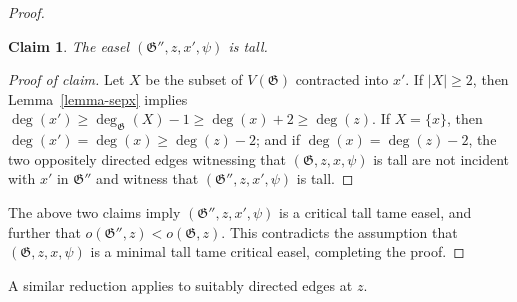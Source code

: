 \documentclass{article}
\newcommand\g{\mathfrak{G}}
\newtheorem*{claim*}{Claim}
\newenvironment{subproof}{%
  \renewcommand{\qedsymbol}{$\blacksquare$}%
  \begin{proof}[Proof of claim]%
}{%
  \end{proof}%
}
\begin{document}
\begin{proof}
\begin{claim*}
The easel $(\g'',z,x',\psi)$ is tall.
\end{claim*}

\begin{subproof}
 Let $X$ be the subset of $V(\g)$ contracted into $x'$.  If $|X|\ge 2$, then Lemma~\ref{lemma-sepx}
implies $\deg(x') \ge \deg_{\g}(X) -1\ge \deg(x) + 2\ge \deg(z)$.  If $X=\{x\}$, then $\deg(x')=\deg(x)\ge \deg(z)-2$; and if $\deg(x)=\deg(z)-2$,
the two oppositely directed edges witnessing that $(\g,z,x,\psi)$ is tall are not incident with $x'$ in $\g''$ and witness that $(\g'',z,x',\psi)$ is tall.
\end{subproof}

The above two claims imply $(\g'',z,x',\psi)$ is a critical tall tame easel, and further that $o(\g'',z)<o(\g,z)$. This contradicts the assumption that $(\g,z,x,\psi)$ is a minimal tall tame critical easel, completing the proof.
\end{proof}

A similar reduction applies to suitably directed edges at $z$.
\end{document}
